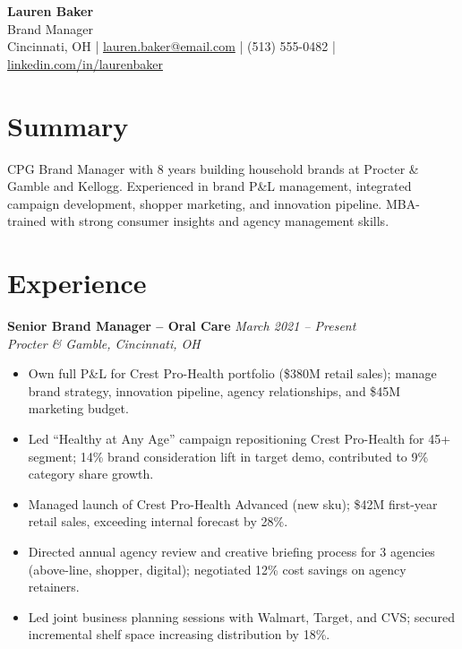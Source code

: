 \documentclass[11pt,a4paper]{article}
\begin{document}
\begin{center}
  {\LARGE \textbf{Lauren Baker}}\\[3pt]
  Brand Manager\\[4pt]
  Cincinnati, OH \quad|\quad
  \href{mailto:lauren.baker@email.com}{lauren.baker@email.com} \quad|\quad
  (513) 555-0482 \quad|\quad
  \href{https://linkedin.com/in/laurenbaker}{linkedin.com/in/laurenbaker}
\end{center}

\section{Summary}
CPG Brand Manager with 8 years building household brands at Procter \& Gamble and Kellogg. Experienced in brand P\&L management, integrated campaign development, shopper marketing, and innovation pipeline. MBA-trained with strong consumer insights and agency management skills.

\section{Experience}

\noindent\textbf{Senior Brand Manager -- Oral Care} \hfill \textit{March 2021 -- Present}\\
\textit{Procter \& Gamble, Cincinnati, OH}
\begin{itemize}
  \item Own full P\&L for Crest Pro-Health portfolio (\$380M retail sales); manage brand strategy, innovation pipeline, agency relationships, and \$45M marketing budget.
  \item Led ``Healthy at Any Age'' campaign repositioning Crest Pro-Health for 45+ segment; 14\% brand consideration lift in target demo, contributed to 9\% category share growth.
  \item Managed launch of Crest Pro-Health Advanced (new sku); \$42M first-year retail sales, exceeding internal forecast by 28\%.
  \item Directed annual agency review and creative briefing process for 3 agencies (above-line, shopper, digital); negotiated 12\% cost savings on agency retainers.
  \item Led joint business planning sessions with Walmart, Target, and CVS; secured incremental shelf space increasing distribution by 18\%.
\end{itemize}
\end{document}
